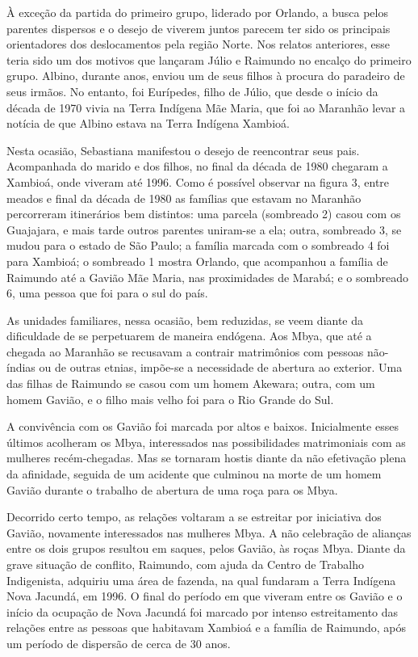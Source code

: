 {{À exceção da partida do primeiro grupo, liderado por Orlando, a busca
pelos parentes dispersos e o desejo de viverem juntos parecem ter sido
os principais orientadores dos deslocamentos pela região Norte. Nos
relatos anteriores, esse teria sido um dos motivos que lançaram Júlio e
Raimundo no encalço do primeiro grupo. Albino, durante anos, enviou um
de seus filhos à procura do paradeiro de seus irmãos. No entanto, foi
Eurípedes, filho de Júlio, que desde o início da década de 1970 vivia na
Terra Indígena Mãe Maria, que foi ao Maranhão levar a notícia de que
Albino estava na Terra Indígena Xambioá.

Nesta ocasião, Sebastiana manifestou o desejo de reencontrar seus pais.
Acompanhada do marido e dos filhos, no final da década de 1980 chegaram
a Xambioá, onde viveram até 1996. Como é possível observar na figura 3,
entre meados e final da década de 1980 as famílias que estavam no
Maranhão percorreram itinerários bem distintos: uma parcela (sombreado
2) casou com os Guajajara, e mais tarde outros parentes uniram-se a ela; 
outra, sombreado 3, se mudou para o estado de São Paulo; a
família marcada com o sombreado 4 foi para Xambioá; o sombreado 1
mostra Orlando, que acompanhou a família de Raimundo até a  Gavião
Mãe Maria, nas proximidades de Marabá; e o sombreado 6, uma pessoa que
foi para o sul do país.

As unidades familiares, nessa ocasião, bem reduzidas, se veem diante da
dificuldade de se perpetuarem de maneira endógena. Aos Mbya, que até a
chegada ao Maranhão se recusavam a contrair matrimônios com pessoas
não-índias ou de outras etnias, impõe-se a necessidade de abertura ao
exterior. Uma das filhas de Raimundo se casou com um homem Akewara;
outra, com um homem Gavião, e o filho mais velho foi para o Rio Grande
do Sul. 

A convivência com os Gavião foi marcada por altos e baixos. Inicialmente
esses últimos acolheram os Mbya, interessados nas possibilidades
matrimoniais com as mulheres recém-chegadas. Mas se tornaram hostis
diante da não efetivação plena da afinidade, seguida de um acidente que
culminou na morte de um homem Gavião durante o trabalho de abertura de
uma roça para os Mbya.

Decorrido certo tempo, as relações voltaram a se estreitar por
iniciativa dos Gavião, novamente interessados nas mulheres Mbya. A não
celebração de alianças entre os dois grupos resultou em saques, pelos
Gavião, às roças Mbya. Diante da grave situação de conflito, Raimundo,
com ajuda da  Centro de Trabalho Indigenista, adquiriu uma área de
fazenda, na qual fundaram a Terra Indígena Nova Jacundá, em 1996. O
final do período em que viveram entre os Gavião e o início da ocupação
de Nova Jacundá foi marcado por intenso estreitamento das relações
entre as pessoas que habitavam Xambioá e a família de Raimundo, após um
período de dispersão de cerca de 30 anos.

}}
